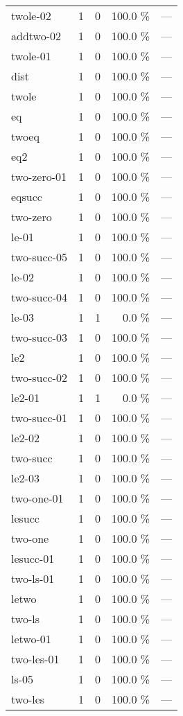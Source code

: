 \documentclass[a4paper]{article}
\begin{document}
\begin{supertabular}{l|r|r|r|r}
twole-02 & 1 & 0 & 100.0 \% & ---\\
addtwo-02 & 1 & 0 & 100.0 \% & ---\\
twole-01 & 1 & 0 & 100.0 \% & ---\\
dist & 1 & 0 & 100.0 \% & ---\\
twole & 1 & 0 & 100.0 \% & ---\\
eq & 1 & 0 & 100.0 \% & ---\\
twoeq & 1 & 0 & 100.0 \% & ---\\
eq2 & 1 & 0 & 100.0 \% & ---\\
two-zero-01 & 1 & 0 & 100.0 \% & ---\\
eqsucc & 1 & 0 & 100.0 \% & ---\\
two-zero & 1 & 0 & 100.0 \% & ---\\
le-01 & 1 & 0 & 100.0 \% & ---\\
two-succ-05 & 1 & 0 & 100.0 \% & ---\\
le-02 & 1 & 0 & 100.0 \% & ---\\
two-succ-04 & 1 & 0 & 100.0 \% & ---\\
le-03 & 1 & 1 & 0.0 \% & ---\\
two-succ-03 & 1 & 0 & 100.0 \% & ---\\
le2 & 1 & 0 & 100.0 \% & ---\\
two-succ-02 & 1 & 0 & 100.0 \% & ---\\
le2-01 & 1 & 1 & 0.0 \% & ---\\
two-succ-01 & 1 & 0 & 100.0 \% & ---\\
le2-02 & 1 & 0 & 100.0 \% & ---\\
two-succ & 1 & 0 & 100.0 \% & ---\\
le2-03 & 1 & 0 & 100.0 \% & ---\\
two-one-01 & 1 & 0 & 100.0 \% & ---\\
lesucc & 1 & 0 & 100.0 \% & ---\\
two-one & 1 & 0 & 100.0 \% & ---\\
lesucc-01 & 1 & 0 & 100.0 \% & ---\\
two-ls-01 & 1 & 0 & 100.0 \% & ---\\
letwo & 1 & 0 & 100.0 \% & ---\\
two-ls & 1 & 0 & 100.0 \% & ---\\
letwo-01 & 1 & 0 & 100.0 \% & ---\\
two-les-01 & 1 & 0 & 100.0 \% & ---\\
ls-05 & 1 & 0 & 100.0 \% & ---\\
two-les & 1 & 0 & 100.0 \% & ---\\

\end{supertabular}
\end{document}
